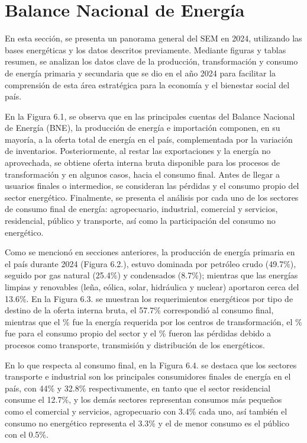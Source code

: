 \documentclass{sener2025}
\begin{document}

\section{Balance Nacional de Energía }

En esta sección, se presenta un panorama general del SEM en 2024, utilizando las bases energéticas y los datos descritos previamente. Mediante figuras y tablas resumen, se analizan los datos clave de la producción, transformación y consumo de energía primaria y secundaria que se dio en el año 2024 para facilitar la comprensión de esta área estratégica para la economía y el bienestar social del país.

En la Figura 6.1, se observa que en las principales cuentas del Balance Nacional de Energía (BNE), la producción de energía e importación componen, en su mayoría, a la oferta total de energía en el país, complementada por la variación de inventarios. Posteriormente, al restar las exportaciones y la energía no aprovechada, se obtiene oferta interna bruta disponible para los procesos de transformación y en algunos casos, hacia el consumo final. Antes de llegar a usuarios finales o intermedios, se consideran las pérdidas y el consumo propio del sector energético. Finalmente, se presenta el análisis por cada uno de los sectores de consumo final de energía: agropecuario, industrial, comercial y servicios, residencial, público y transporte, así como la participación del consumo no energético.

Como se mencionó en secciones anteriores, la producción de energía primaria en el país durante 2024 (Figura 6.2.), estuvo dominada por petróleo crudo (49.7\%), seguido por gas natural (25.4\%) y condensados (8.7\%); mientras que las energías limpias y renovables (leña, eólica, solar, hidráulica y nuclear) aportaron cerca del 13.6\%.
En la Figura 6.3. se muestran los requerimientos energéticos por tipo de destino de la oferta interna bruta, el 57.7\% correspondió al consumo final, mientras que el \% fue la energía requerida por los centros de transformación, el \% fue para el consumo propio del sector y el \% fueron las pérdidas debido a procesos como transporte, transmisión y distribución de los energéticos.

En lo que respecta al consumo final, en la Figura 6.4. se destaca que los sectores transporte e industrial son los principales consumidores finales de energía en el país, con 44\% y 32.8\% respectivamente, en tanto que el sector residencial consume el 12.7\%, y los demás sectores representan consumos más pequeños como el comercial y servicios, agropecuario con 3.4\% cada uno, así también el consumo no energético representa el 3.3\% y el de menor consumo es el público con el 0.5\%.
\end{document}
